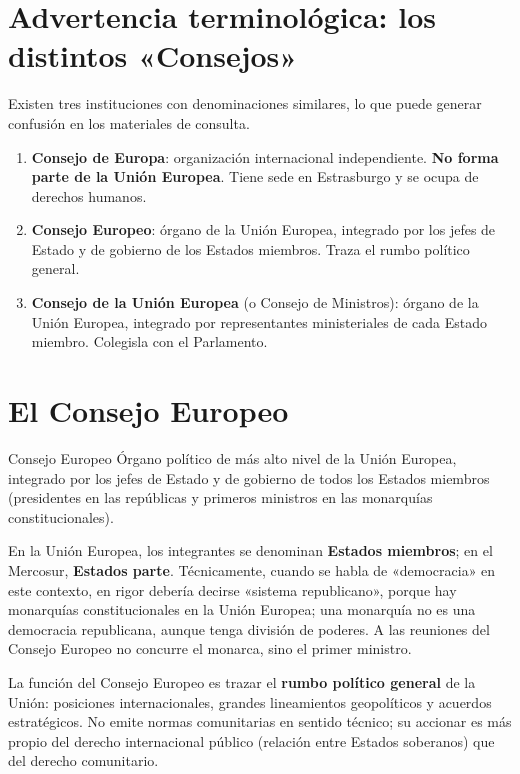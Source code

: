 \documentclass[12pt,oneside]{book}
\begin{document}
\section{Advertencia terminológica: los distintos «Consejos»}

Existen tres instituciones con denominaciones similares, lo que puede generar confusión en los materiales de consulta.

\begin{importante}
\begin{enumerate}
    \item \textbf{Consejo de Europa}: organización internacional independiente. \textbf{No forma parte de la Unión Europea}. Tiene sede en Estrasburgo y se ocupa de derechos humanos.
    \item \textbf{Consejo Europeo}: órgano de la Unión Europea, integrado por los jefes de Estado y de gobierno de los Estados miembros. Traza el rumbo político general.
    \item \textbf{Consejo de la Unión Europea} (o Consejo de Ministros): órgano de la Unión Europea, integrado por representantes ministeriales de cada Estado miembro. Colegisla con el Parlamento.
\end{enumerate}
\end{importante}

\section{El Consejo Europeo}

\begin{definicion}{Consejo Europeo}
Órgano político de más alto nivel de la Unión Europea, integrado por los jefes de Estado y de gobierno de todos los Estados miembros (presidentes en las repúblicas y primeros ministros en las monarquías constitucionales).
\end{definicion}

\begin{nota}
En la Unión Europea, los integrantes se denominan \textbf{Estados miembros}; en el Mercosur, \textbf{Estados parte}. Técnicamente, cuando se habla de «democracia» en este contexto, en rigor debería decirse «sistema republicano», porque hay monarquías constitucionales en la Unión Europea; una monarquía no es una democracia republicana, aunque tenga división de poderes. A las reuniones del Consejo Europeo no concurre el monarca, sino el primer ministro.
\end{nota}

La función del Consejo Europeo es trazar el \textbf{rumbo político general} de la Unión: posiciones internacionales, grandes lineamientos geopolíticos y acuerdos estratégicos. No emite normas comunitarias en sentido técnico; su accionar es más propio del derecho internacional público (relación entre Estados soberanos) que del derecho comunitario.
\end{document}
